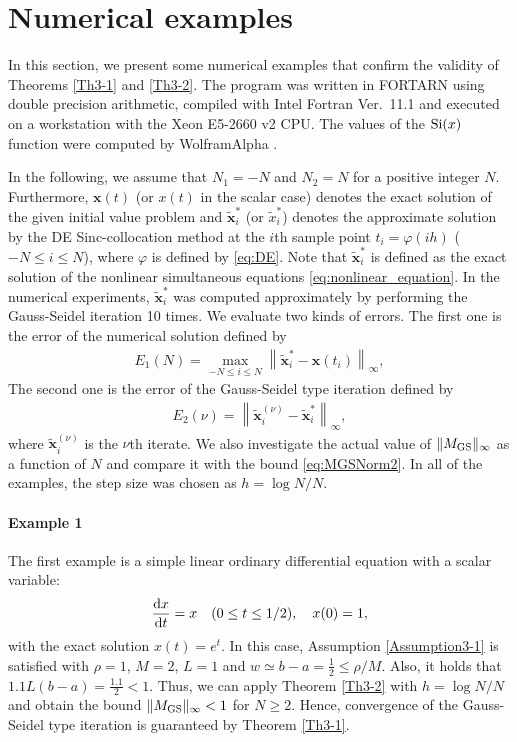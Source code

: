 \documentclass[pdflatex,sn-mathphys-num]{sn-jnl}%
\theoremstyle{thmstyleone}%
\theoremstyle{thmstyletwo}%
\theoremstyle{thmstylethree}%
\begin{document}
\section{Numerical examples}
\label{Results}
In this section, we present some numerical examples that confirm the validity of Theorems \ref{Th3-1} and \ref{Th3-2}. The program was written in FORTARN using double precision arithmetic, compiled with Intel Fortran Ver.~11.1 and executed on a workstation with the Xeon E5-2660 v2 CPU. The values of the ${\rm Si}(x)$ function were computed by WolframAlpha \cite{WolframAlpha}.

In the following, 
we assume that 
$N_{1} = -N$ and $N_{2} = N$ for a positive integer $N$.
Furthermore, 
${\bm x}(t)$ (or $x(t)$ in the scalar case) denotes the exact solution of the given initial value problem and $\widetilde{\bm x}_i^*$ (or $\widetilde{x}_i^*$) denotes the approximate solution by the DE Sinc-collocation method at the $i$th sample point $t_i=\varphi(ih)$ ($-N\le i\le N$), where $\varphi$ is defined by \eqref{eq:DE}. 
Note that $\widetilde{\bm x}_i^*$ is defined as the exact solution of the nonlinear simultaneous equations \eqref{eq:nonlinear_equation}. In the numerical experiments, $\widetilde{\bm x}_i^*$ was computed approximately by performing the Gauss-Seidel iteration 10 times. We evaluate two kinds of errors. The first one is the error of the numerical solution defined by
\begin{align}
E_1(N)=\max_{-N\le i\le N}\left\|\widetilde{\bm x}_i^*-{\bm x}(t_i)\right\|_{\infty},
\end{align}
The second one is the error of the Gauss-Seidel type iteration defined by
\begin{align}
E_2(\nu)=\left\|\widetilde{\bm x}_i^{(\nu)}-\widetilde{\bm x}_i^*\right\|_{\infty},
\end{align}
where $\widetilde{\bm x}_i^{(\nu)}$ is the $\nu$th iterate. We also investigate the actual value of $\|M_{\rm GS}\|_{\infty}$ as a function of $N$ and compare it with the bound \eqref{eq:MGSNorm2}. In all of the examples, the step size was chosen as $h=\log N/N$.

\paragraph{Example 1}
The first example is a simple linear ordinary differential equation with a scalar variable:
\begin{align}
\frac{{\rm d}x}{{\rm d}t}=x \quad (0\le t\le 1/2), \quad x(0)=1,
\label{eq:example1}
\end{align}
with the exact solution $x(t)=e^t$. In this case, Assumption \ref{Assumption3-1} is satisfied with $\rho=1$, $M=2$, $L=1$ and $w\simeq b-a=\frac{1}{2}\le \rho/M$. Also, it holds that $1.1L(b-a)=\frac{1.1}{2}<1$. Thus, we can apply Theorem \ref{Th3-2} with $h=\log N/N$ and obtain the bound $\|M_{\rm GS}\|_{\infty}<1$ for $N\ge 2$. Hence, convergence of the Gauss-Seidel type iteration is guaranteed by Theorem \ref{Th3-1}.
\end{document}
